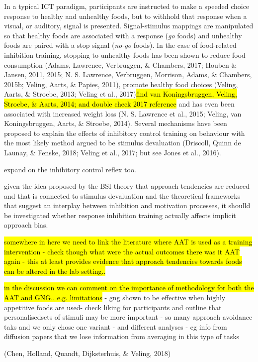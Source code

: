 \documentclass[man,floatsintext]{apa6}
\begin{document}
In a typical ICT paradigm, participants are instructed to make a speeded
choice response to healthy and unhealthy foods, but to withhold that
response when a visual, or auditory, signal is presented.
Signal-stimulus mappings are manipulated so that healthy foods are
associated with a response (\textit{go} foods) and unhealthy foods are
paired with a stop signal (\textit{no-go} foods). In the case of
food-related inhibition training, stopping to unhealthy foods has been
shown to reduce food consumption (Adams, Lawrence, Verbruggen, \&
Chambers, 2017; Houben \& Jansen, 2011, 2015; N. S. Lawrence,
Verbruggen, Morrison, Adams, \& Chambers, 2015b; Veling, Aarts, \&
Papies, 2011), promote healthy food choices (Veling, Aarts, \& Stroebe,
2013; Veling et al.,
2017)\hl{find van Koningsbruggen, Veling, Stroebe, \& Aarts, 2014; and double check 2017 reference}
and has even been associated with increased weight loss (N. S. Lawrence
et al., 2015; Veling, van Koningsbruggen, Aarts, \& Stroebe, 2014).
Several mechanisms have been proposed to explain the effects of
inhibitory control training on behaviour with the most likely method
argued to be stimulus devaluation (Driscoll, Quinn de Launay, \& Fenske,
2018; Veling et al., 2017; but see Jones et al., 2016).

expand on the inhibitory control reflex too.

given the idea proposed by the BSI theory that approach tendencies are
reduced and that is connected to stimulus devaluation and the
theoretical frameworks that suggest an interplay between inhibition and
motivation processes, it shoulld be investigated whether response
inhibition training actually affects implicit approach bias.

\hl{somewhere in here we need to link the literature where AAT is used as a training intervention - check though what were the actual outcomes there was it AAT again - this at least provides evidence that approach tendencies towards foods can be altered in the lab setting..}

\hl{in the discussion we can comment on the importance of methodology for both the AAT and GNG.. e.g. limitations}
- gng shown to be effective when highly appetitive foods are used- check
liking for participants and outline that personalisedsets of stimuli may
be more important - so many approach avoidance taks and we only chose
one variant - and different analyses - eg info from diffusion papers
that we lose information from averaging in this type of tasks

(Chen, Holland, Quandt, Dijksterhuis, \& Veling, 2018)
\end{document}
